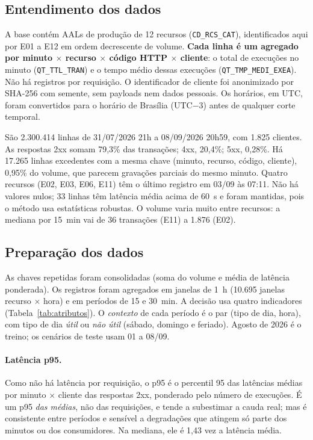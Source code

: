 \documentclass[sigconf,nonacm]{acmart}
\begin{document}
\subsection{Entendimento dos dados}
A base contém AALs de produção de 12 recursos (\texttt{CD\_RCS\_CAT}), identificados aqui por E01 a E12 em ordem decrescente de volume. \textbf{Cada linha é um agregado por minuto $\times$ recurso $\times$ código HTTP $\times$ cliente}: o total de execuções no minuto (\texttt{QT\_TTL\_TRAN}) e o tempo médio dessas execuções (\texttt{QT\_TMP\_MEDI\_EXEA}). Não há registros por requisição. O identificador de cliente foi anonimizado por SHA-256 com semente, sem payloads nem dados pessoais. Os horários, em UTC, foram convertidos para o horário de Brasília (UTC$-3$) antes de qualquer corte temporal.

São 2.300.414 linhas de 31/07/2026 21h a 08/09/2026 20h59, com 1.825 clientes. As respostas 2xx somam 79,3\% das transações; 4xx, 20,4\%; 5xx, 0,28\%. Há 17.265 linhas excedentes com a mesma chave (minuto, recurso, código, cliente), 0,95\% do volume, que parecem gravações parciais do mesmo minuto. Quatro recursos (E02, E03, E06, E11) têm o último registro em 03/09 às 07:11. Não há valores nulos; 33 linhas têm latência média acima de 60~s e foram mantidas, pois o método usa estatísticas robustas. O volume varia muito entre recursos: a mediana por 15~min vai de 36 transações (E11) a 1.876 (E02).

\subsection{Preparação dos dados}
As chaves repetidas foram consolidadas (soma do volume e média de latência ponderada). Os registros foram agregados em janelas de 1~h (10.695 janelas recurso $\times$ hora) e em períodos de 15 e 30~min. A decisão usa quatro indicadores (Tabela~\ref{tab:atributos}). O \emph{contexto} de cada período é o par (tipo de dia, hora), com tipo de dia \emph{útil} ou \emph{não útil} (sábado, domingo e feriado). Agosto de 2026 é o treino; os cenários de teste usam 01 a 08/09.

\paragraph{Latência p95.} Como não há latência por requisição, o p95 é o percentil 95 das latências médias por minuto $\times$ cliente das respostas 2xx, ponderado pelo número de execuções. É um p95 \emph{das médias}, não das requisições, e tende a subestimar a cauda real; mas é consistente entre períodos e sensível a degradações que atingem só parte dos minutos ou dos consumidores. Na mediana, ele é 1,43 vez a latência média.
\end{document}

